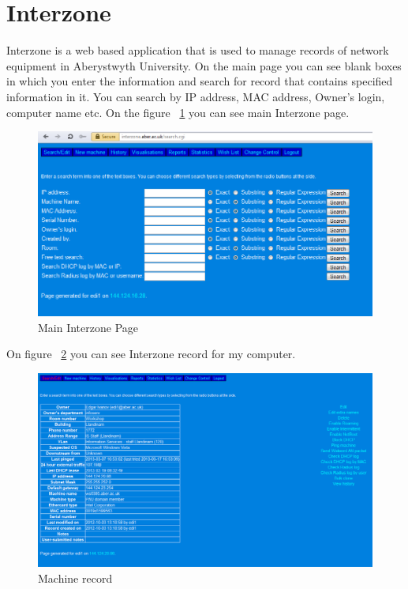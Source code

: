 \documentclass[10pt,a4paper,headinclude=true]{report}
\begin{document}
\section{Interzone}
Interzone is a web based application that is used to manage records of network equipment in Aberystwyth University. On the main page you can see blank boxes in which you enter the information and search for record that contains specified information in it. You can search by IP address, MAC address, Owner's login, computer name etc. On the figure ~\ref{fig:main_interzone_page} you can see main Interzone page.

\begin{figure}[H]
\centering
\centerline{\includegraphics[scale=0.5]{./main_interzone_page}}
\caption{Main Interzone Page}
\label{fig:main_interzone_page}
\end{figure}

On figure ~\ref{fig:machine_record} you can see Interzone record for my computer.

\begin{figure}[H]
\centering
\centerline{\includegraphics[scale=0.5]{./machine_record}}
\caption{Machine record}
\label{fig:machine_record}
\end{figure}
\end{document}
